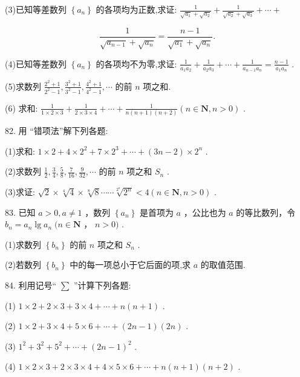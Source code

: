 \documentclass[10pt]{article}
\begin{document}
(3)已知等差数列 \(\left\{  {a}_{n}\right\}\) 的各项均为正数,求证: \(\frac{1}{\sqrt{{a}_{1}} + \sqrt{{a}_{2}}} + \frac{1}{\sqrt{{a}_{2}} + \sqrt{{a}_{3}}} + \cdots  +\)

\[
\frac{1}{\sqrt{{a}_{n - 1}} + \sqrt{{a}_{n}}} = \frac{n - 1}{\sqrt{{a}_{1}} + \sqrt{{a}_{n}}}.
\]

(4)已知等差数列 \(\left\{  {a}_{n}\right\}\) 的各项均不为零,求证: \(\frac{1}{{a}_{1}{a}_{2}} + \frac{1}{{a}_{2}{a}_{3}} + \cdots  + \frac{1}{{a}_{n - 1}{a}_{n}} = \frac{n - 1}{{a}_{1}{a}_{n}}\) .

(5)求数列 \(\frac{{2}^{2} + 1}{{2}^{2} - 1},\frac{{3}^{2} + 1}{{3}^{2} - 1},\frac{{4}^{2} + 1}{{4}^{2} - 1},\cdots\) 的前 \(n\) 项之和.

(6) 求和: \(\frac{1}{1 \times  2 \times  3} + \frac{1}{2 \times  3 \times  4} + \cdots  + \frac{1}{n\left( {n + 1}\right) \left( {n + 2}\right) }\left( {n \in  \mathbf{N},n > 0}\right)\) .

82. 用 “错项法”解下列各题:

(1)求和: \({1 \times  2 + 4 \times  {2}^{2} + 7 \times  {2}^{3} + \cdots } + \left( {{3n} - 2}\right)  \times  {2}^{n}\) .

(2)求数列 \(\frac{1}{2},\frac{3}{4},\frac{5}{8},\frac{7}{16},\frac{9}{32},\cdots\) 的前 \(n\) 项之和 \({S}_{n}\) .

(3)求证: \(\sqrt{2} \times  \sqrt[4]{4} \times  \sqrt[8]{8}\cdots \cdots \sqrt[{2}^{n}]{{2}^{n}} < 4\left( {n \in  \mathbf{N},n > 0}\right)\) .

83. 已知 \(a > 0,a \neq  1\) ，数列 \(\left\{  {a}_{n}\right\}\) 是首项为 \(a\) ，公比也为 \(a\) 的等比数列，令 \({b}_{n} = {a}_{n}\lg {a}_{n}\;(n \in  \mathbf{N}\) ， \(n > 0)\) .

(1)求数列 \(\left\{  {b}_{n}\right\}\) 的前 \(n\) 项之和 \({S}_{n}\) .

(2)若数列 \(\left\{  {b}_{n}\right\}\) 中的每一项总小于它后面的项,求 \(a\) 的取值范围.

84. 利用记号“ \(\sum\) ”计算下列各题:

(1) \(1 \times  2 + 2 \times  3 + 3 \times  4 + \cdots  + n\left( {n + 1}\right)\) .

(2) \(1 \times  2 + 3 \times  4 + 5 \times  6 + \cdots  + \left( {{2n} - 1}\right) \left( {2n}\right)\) .

(3) \({1}^{2} + {3}^{2} + {5}^{2} + \cdots  + {\left( 2n - 1\right) }^{2}\) .

(4) \(1 \times  2 \times  3 + 2 \times  3 \times  4 + 4 \times  5 \times  6 + \cdots  + n\left( {n + 1}\right) \left( {n + 2}\right)\) .
\end{document}
